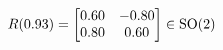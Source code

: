 \documentclass[preview]{standalone}
\begin{document}
\begin{align*}
\special{dvisvgm:raw <g id='unique000'>}R(0.93) = \begin{bmatrix} 0.60 & -0.80 \\ 0.80 & 0.60 \end{bmatrix} \in \text{SO}(2)\special{dvisvgm:raw </g>}
\end{align*}
\end{document}
